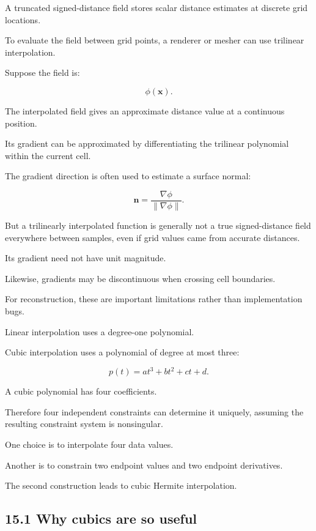 \hypertarget{02-foundations-ii-ch028-application-to-tsdf-sampling}{}

A truncated signed-distance field stores scalar distance estimates at discrete grid locations.

To evaluate the field between grid points, a renderer or mesher can use trilinear interpolation.

Suppose the field is:

\[ \phi(\mathbf x). \]

The interpolated field gives an approximate distance value at a continuous position.

Its gradient can be approximated by differentiating the trilinear polynomial within the current cell.

The gradient direction is often used to estimate a surface normal:

\[ \mathbf n= \frac{\nabla\phi}{\|\nabla\phi\|}. \]

But a trilinearly interpolated function is generally not a true signed-distance field everywhere between samples, even if grid values came from accurate distances.

Its gradient need not have unit magnitude.

Likewise, gradients may be discontinuous when crossing cell boundaries.

For reconstruction, these are important limitations rather than implementation bugs.

Linear interpolation uses a degree-one polynomial.

Cubic interpolation uses a polynomial of degree at most three:

\[ \boxed{ p(t)=at^3+bt^2+ct+d. } \]

A cubic polynomial has four coefficients.

Therefore four independent constraints can determine it uniquely, assuming the resulting constraint system is nonsingular.

One choice is to interpolate four data values.

Another is to constrain two endpoint values and two endpoint derivatives.

The second construction leads to cubic Hermite interpolation.

\subsection{15.1 Why cubics are so useful}\label{02-foundations-ii-ch028-why-cubics-are-so-useful}

